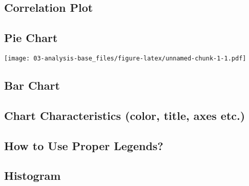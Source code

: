 \documentclass[
]{book}
\newenvironment{Shaded}{\begin{snugshade}}{\end{snugshade}}
\newcommand{\DataTypeTok}[1]{\textcolor[rgb]{0.13,0.29,0.53}{#1}}
\newcommand{\DecValTok}[1]{\textcolor[rgb]{0.00,0.00,0.81}{#1}}
\newcommand{\KeywordTok}[1]{\textcolor[rgb]{0.13,0.29,0.53}{\textbf{#1}}}
\newcommand{\NormalTok}[1]{#1}
\newcommand{\OtherTok}[1]{\textcolor[rgb]{0.56,0.35,0.01}{#1}}
\newcommand{\StringTok}[1]{\textcolor[rgb]{0.31,0.60,0.02}{#1}}
\begin{document}
\hypertarget{correlation-plot}{%
\subsection{Correlation Plot}\label{correlation-plot}}

\hypertarget{pie-chart}{%
\subsection{Pie Chart}\label{pie-chart}}

\begin{Shaded}
\end{Shaded}

\texttt{[image: 03-analysis-base\_files/figure-latex/unnamed-chunk-1-1.pdf]}

\hypertarget{bar-chart}{%
\subsection{Bar Chart}\label{bar-chart}}

\hypertarget{chart-characteristics-color-title-axes-etc.}{%
\subsection{Chart Characteristics (color, title, axes etc.)}\label{chart-characteristics-color-title-axes-etc.}}

\hypertarget{how-to-use-proper-legends}{%
\subsection{How to Use Proper Legends?}\label{how-to-use-proper-legends}}

\hypertarget{histogram}{%
\subsection{Histogram}\label{histogram}}
\end{document}
